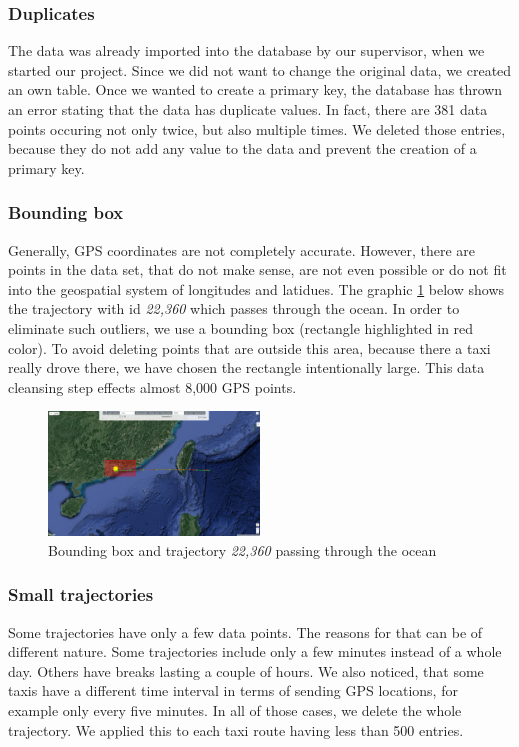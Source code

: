 \documentclass[10pt]{sig-alternate}
\begin{document}
\subsubsection{Duplicates}
The data was already imported into the database by our supervisor, when we started our project. Since we did not want to change the original data, we created an own table. Once we wanted to create a primary key, the database has thrown an error stating that the data has duplicate values. In fact, there are 381 data points occuring not only twice, but also multiple times. We deleted those entries, because they do not add any value to the data and prevent the creation of a primary key.

\subsubsection{Bounding box}
Generally, GPS coordinates are not completely accurate. However, there are points in the data set, that do not make sense, are not even possible or do not fit into the geospatial system of longitudes and latidues. The graphic \ref{fig:bbox} below shows the trajectory with id \textit{22,360} which passes through the ocean. In order to eliminate such outliers, we use a bounding box (rectangle highlighted in red color). To avoid deleting points that are outside this area, because there a taxi really drove there, we have chosen the rectangle intentionally large. This data cleansing step effects almost 8,000 GPS points.

\begin{figure}[ht]
\centering
\includegraphics[width=0.5\textwidth]{img/bounding_box.png}
\caption{Bounding box and trajectory \textit{22,360} passing through the ocean}
\label{fig:bbox}
\end{figure}


\subsubsection{Small trajectories}
Some trajectories have only a few data points. The reasons for that can be of different nature. Some trajectories include only a few minutes instead of a whole day. Others have breaks lasting a couple of hours. We also noticed, that some taxis have a different time interval in terms of sending GPS locations, for example only every five minutes. In all of those cases, we delete the whole trajectory. We applied this to each taxi route having less than 500 entries.
\end{document}
